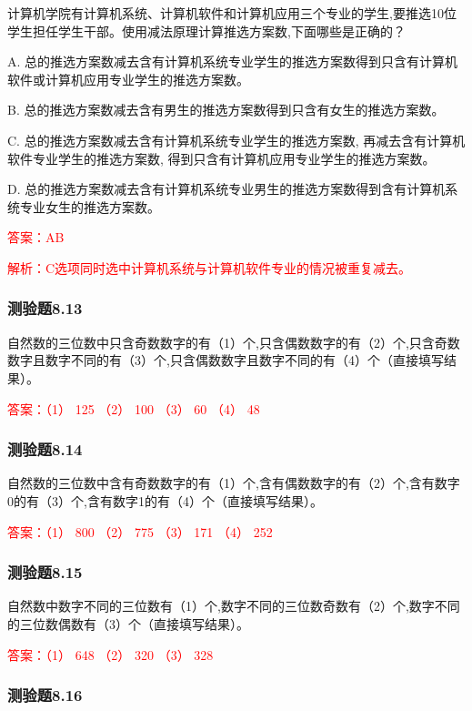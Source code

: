 \documentclass[UTF8, heading=true]{ctexart}
\begin{document}
计算机学院有计算机系统、计算机软件和计算机应用三个专业的学生,要推选10位学生担任学生干部。使用减法原理计算推选方案数,下面哪些是正确的？

A. 总的推选方案数减去含有计算机系统专业学生的推选方案数得到只含有计算机软件或计算机应用专业学生的推选方案数。

B. 总的推选方案数减去含有男生的推选方案数得到只含有女生的推选方案数。

C. 总的推选方案数减去含有计算机系统专业学生的推选方案数, 再减去含有计算机软件专业学生的推选方案数, 得到只含有计算机应用专业学生的推选方案数。

D. 总的推选方案数减去含有计算机系统专业男生的推选方案数得到含有计算机系统专业女生的推选方案数。

\textcolor{red}{答案：AB}

\textcolor{red}{解析：C选项同时选中计算机系统与计算机软件专业的情况被重复减去。}

\subsubsection{测验题8.13}

自然数的三位数中只含奇数数字的有（1）个,只含偶数数字的有（2）个,只含奇数数字且数字不同的有（3）个,只含偶数数字且数字不同的有（4）个（直接填写结果）。

\textcolor{red}{答案：（1） 125 （2） 100 （3） 60 （4） 48}


\subsubsection{测验题8.14}
自然数的三位数中含有奇数数字的有（1）个,含有偶数数字的有（2）个,含有数字0的有（3）个,含有数字1的有（4）个（直接填写结果）。

\textcolor{red}{答案：（1） 800 （2） 775 （3） 171 （4） 252}

\subsubsection{测验题8.15}

自然数中数字不同的三位数有（1）个,数字不同的三位数奇数有（2）个,数字不同的三位数偶数有（3）个（直接填写结果）。

\textcolor{red}{答案：（1） 648 （2） 320 （3） 328}

\subsubsection{测验题8.16}
\end{document}

